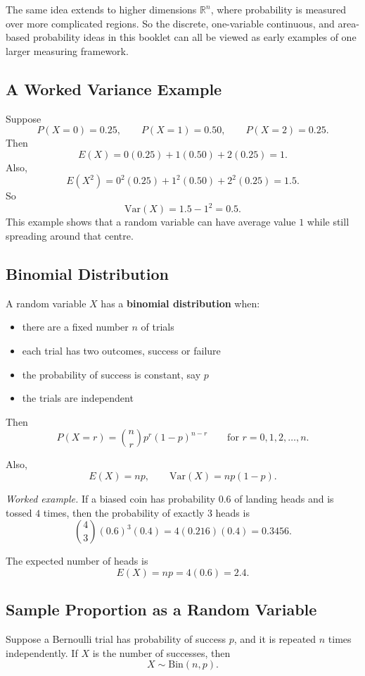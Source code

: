 The same idea extends to higher dimensions $\mathbb{R}^n$, where probability is measured over more complicated regions. So the discrete, one-variable continuous, and area-based probability ideas in this booklet can all be viewed as early examples of one larger measuring framework.

\subsection{A Worked Variance Example}

Suppose
\[
P(X=0)=0.25,\qquad P(X=1)=0.50,\qquad P(X=2)=0.25.
\]
Then
\[
E(X)=0(0.25)+1(0.50)+2(0.25)=1.
\]
Also,
\[
E(X^2)=0^2(0.25)+1^2(0.50)+2^2(0.25)=1.5.
\]
So
\[
\mathrm{Var}(X)=1.5-1^2=0.5.
\]
This example shows that a random variable can have average value $1$ while still spreading around that centre.

\subsection{Binomial Distribution}

A random variable $X$ has a \textbf{binomial distribution} when:
\begin{itemize}[leftmargin=*]
  \item there are a fixed number $n$ of trials
  \item each trial has two outcomes, success or failure
  \item the probability of success is constant, say $p$
  \item the trials are independent
\end{itemize}

Then
\[
P(X=r)=\binom{n}{r}p^r(1-p)^{n-r}
\qquad \text{for } r=0,1,2,\dots,n.
\]

Also,
\[
E(X)=np,
\qquad
\mathrm{Var}(X)=np(1-p).
\]

\textit{Worked example.} If a biased coin has probability $0.6$ of landing heads and is tossed $4$ times, then the probability of exactly $3$ heads is
\[
\binom43(0.6)^3(0.4)=4(0.216)(0.4)=0.3456.
\]

The expected number of heads is
\[
E(X)=np=4(0.6)=2.4.
\]

\subsection{Sample Proportion as a Random Variable}

Suppose a Bernoulli trial has probability of success $p$, and it is repeated $n$ times independently. If $X$ is the number of successes, then
\[
X\sim \mathrm{Bin}(n,p).
\]

